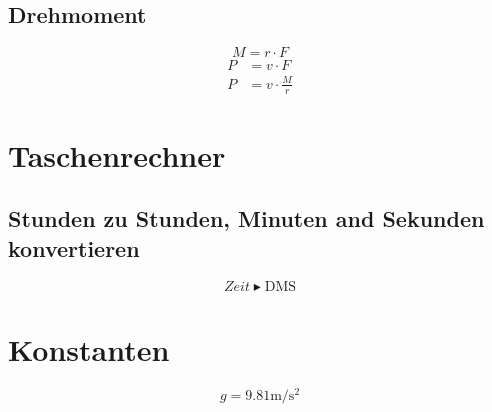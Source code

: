 \documentclass[a4paper]{IEEEtran}
\begin{document}
  \subsection{Drehmoment}
  \begin{equation}
    M = r \cdot F
  \end{equation}
  \begin{align}
    P &= v \cdot F \\
    P &= v \cdot \frac{M}{r}
  \end{align}

  \section{Taschenrechner}
  \subsection{Stunden zu Stunden, Minuten and Sekunden konvertieren}
  \begin{equation}
    Zeit \blacktriangleright \mbox{DMS}
  \end{equation}

  \section{Konstanten}
  \begin{equation}
    g = 9.81 \si{\metre\per\square\second}
  \end{equation}
\end{document}
